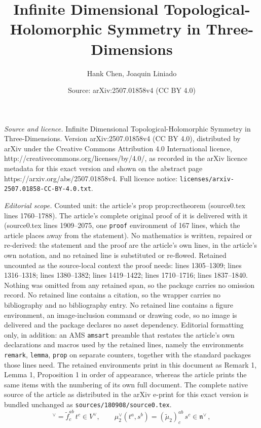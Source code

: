 \documentclass[10pt,a4paper]{amsart}
\title{Infinite Dimensional Topological-Holomorphic Symmetry in Three-Dimensions}
\author{Hank Chen, Joaquin Liniado}
\date{Source: arXiv:2507.01858v4 (CC BY 4.0)}
\begin{document}
\maketitle

\noindent\emph{Source and licence.} Infinite Dimensional Topological-Holomorphic Symmetry in Three-Dimensions. Version arXiv:2507.01858v4 (CC BY 4.0), distributed by arXiv under the Creative Commons Attribution 4.0 International licence, http://creativecommons.org/licenses/by/4.0/, as recorded in the arXiv licence metadata for this exact version and shown on the abstract page https://arxiv.org/abs/2507.01858v4. Full licence notice: \texttt{licenses/arxiv-2507.01858-CC-BY-4.0.txt}.\par\smallskip

\noindent\textit{Editorial scope.} Counted unit: the article's prop prop:rectheorem (source0.tex lines 1760--1788). The article's complete original proof of it is delivered with it (source0.tex lines 1909--2075, one \texttt{proof} environment of 167 lines, which the article places away from the statement). No mathematics is written, repaired or re-derived: the statement and the proof are the article's own lines, in the article's own notation, and no retained line is substituted or re-flowed.  Retained uncounted as the source-local context the proof needs: lines 1305--1309; lines 1316--1318; lines 1380--1382; lines 1419--1422; lines 1710--1716; lines 1837--1840.  Nothing was omitted from any retained span, so the package carries no omission record.  No retained line contains a citation, so the wrapper carries no bibliography and no bibliography entry.  No retained line contains a figure environment, an image-inclusion command or drawing code, so no image is delivered and the package declares no asset dependency.  Editorial formatting only, in addition: an AMS \texttt{amsart} preamble that restates the article's own declarations and macros used by the retained lines, namely the environments \texttt{remark}, \texttt{lemma}, \texttt{prop} on separate counters, together with the standard packages those lines need.  The retained environments print in this document as Remark 1, Lemma 1, Proposition 1 in order of appearance, whereas the article prints the same items with the numbering of its own full document.  The complete native source of the article as distributed in the arXiv e-print for this exact version is bundled unchanged as \texttt{sources/180908/source0.tex}.
\begin{equation}
    [t^a, t^b]^\vee = \tilde f^{ab}_c\, t^c \in V^\vee, \qquad
    \mu_2^\vee(t^a,s^b) = (\tilde\mu_2)^{ab}_c\, s^c \in \mathfrak{n}^\vee\,,
    \label{ec:aff2liealgbrack}
\end{equation}
\end{document}
